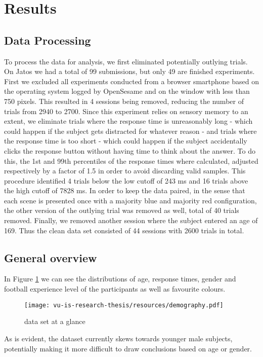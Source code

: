 \section{Results}\label{s:evaluation}
\subsection{Data Processing}
To process the data for analysis, we first eliminated potentially outlying trials. On Jatos we had a total of 99 submissions, but only 49 are finished experiments. First we excluded all experiments conducted from a browser smartphone based on the operating system logged by OpenSesame and on the window with less than 750 pixels. This resulted in 4 sessions being removed, reducing the number of trials from 2940 to 2700.
Since this experiment relies on sensory memory to an extent, we eliminate trials where the response time is unreasonably long - which could happen if the subject gets distracted for whatever reason - and trials where the response time is too short - which could happen if the subject accidentally clicks the response button without having time to think about the answer. To do this, the 1st and 99th percentiles of the response times where calculated, adjusted respectively by a factor of 1.5 in order to avoid discarding valid samples. This procedure identified 4 trials below the low cutoff of 243 ms and 16 trials above the high cutoff of 7828 ms. In order to keep the data paired, in the sense that each scene is presented once with a majority blue and majority red configuration, the other version of the outlying trial was removed as well, total of 40 trials removed. Finally, we removed another session where the subject entered an age of 169. Thus the clean data set consisted of 44 sessions with 2600 trials in total.

\subsection{General overview}
In Figure \ref{stats1} we can see the distributions of age, response times, gender and football experience level of the participants as well as favourite colours. 
\begin{figure}[h!]
    \hspace{-0.5cm} %
    \texttt{[image: vu-is-research-thesis/resources/demography.pdf]}
   \caption{data set at a glance}
   \label{stats1}
\end{figure}
As is evident, the dataset currently skews towards younger male subjects, potentially making it more difficult to draw conclusions based on age or gender. 
